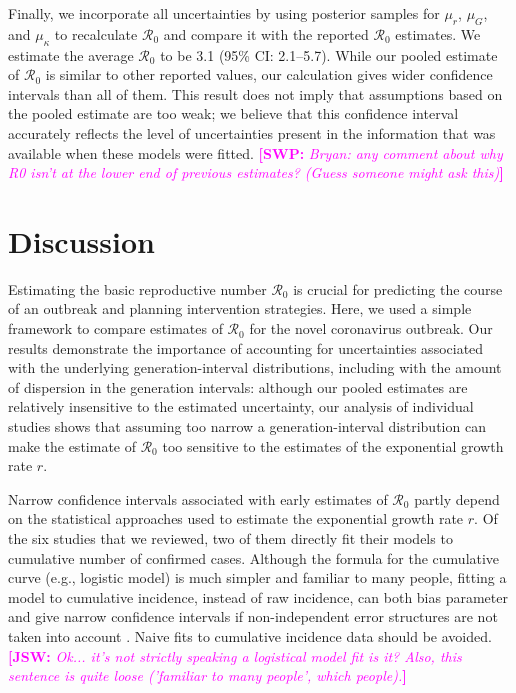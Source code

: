 \documentclass[12pt]{article}
\newcommand{\Rx}[1]{\ensuremath{{\mathcal R}_{#1}}}
\newcommand{\Ro}{\Rx{0}\xspace}
\newcommand{\comment}[3]{\textcolor{#1}{\textbf{[#2: }\textsl{#3}\textbf{]}}}
\newcommand{\swp}[1]{\comment{magenta}{SWP}{#1}}
\newcommand{\jsw}[1]{\comment{magenta}{JSW}{#1}}
\begin{document}
Finally, we incorporate all uncertainties by using posterior samples for $\mu_r$, $\mu_G$, and $\mu_\kappa$ to recalculate \Ro and compare it with the reported \Ro estimates.
We estimate the average \Ro to be 3.1 (95\% CI: 2.1--5.7).
While our pooled estimate of \Ro is similar to other reported values, our calculation gives wider confidence intervals than all of them.
This result does not imply that assumptions based on the pooled estimate are too weak;
we believe that this confidence interval accurately reflects the level of uncertainties present in the information that was available when these models were fitted.
\swp{Bryan: any comment about why R0 isn’t at the lower end of previous estimates? (Guess someone might ask this)}

\section{Discussion}

Estimating the basic reproductive number \Ro is crucial for predicting the course of an outbreak and planning intervention strategies.
Here, we used a simple framework \citep{park2019practical} to compare estimates of \Ro for the novel coronavirus outbreak.
Our results demonstrate the importance of accounting for uncertainties associated with the underlying generation-interval distributions, including with the amount of dispersion in the generation intervals:
although our pooled estimates are relatively insensitive to the estimated uncertainty, our analysis of individual studies shows that assuming too narrow a generation-interval distribution can make the estimate of \Ro too sensitive to the estimates of the exponential growth rate $r$.

Narrow confidence intervals associated with early estimates of \Ro partly depend on the statistical approaches used to estimate the exponential growth rate $r$.
Of the six studies that we reviewed, two of them directly fit their models to cumulative number of confirmed cases.
Although the formula for the cumulative curve (e.g., logistic model) is much simpler and familiar to many people, fitting a model to cumulative incidence, instead of raw incidence, can both bias parameter and give narrow confidence intervals if non-independent error structures are not taken into account \citep{ma2014estimating, king2015avoidable}.
Naive fits to cumulative incidence data should be avoided.
\jsw{Ok... it's not strictly speaking a logistical model fit is it?  Also, this sentence is quite loose ('familiar to many people', which people).}
\end{document}
